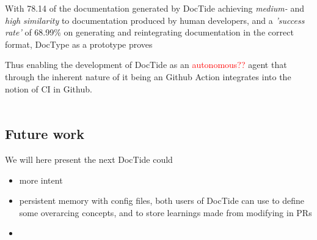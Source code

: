 With 78.14\‰ of the documentation generated by DocTide achieving \textit{medium-} and \textit{high similarity} to documentation produced by human developers, and a \textit{'success rate'} of 68.99\% on generating and reintegrating documentation in the correct format, DocType as a prototype proves 




Thus enabling the development of DocTide as an \textcolor{red}{autonomous??} agent that through the inherent nature of it being an Github Action integrates into the notion of CI in Github. 
\\\\


\subsection{Future work}
We will here present the next DocTide could 
\begin{itemize}
    \item more intent 
        \item persistent memory with config files, both users of DocTide can use to define some overarcing concepts, and to store learnings made from modifying in PRs
        \item 
\end{itemize}
